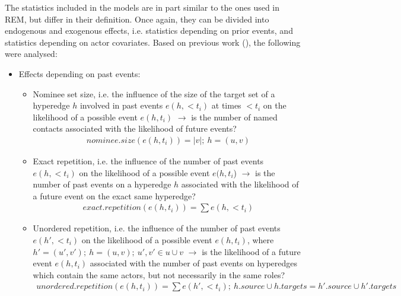 The statistics included in the models are in part similar to the ones used in REM, but differ in their definition. Once again, they can be divided into endogenous and exogenous effects, i.e. statistics depending on prior events, and statistics depending on actor covariates. Based on previous work (\cite{lerner2019rem,lerner2021relational,hancean2021role,hancean2022occupations}), the following were analysed:

\begin{itemize}
	\item Effects depending on past events:
	\begin{itemize}
		\item Nominee set size, i.e. the influence of the size of the target set of a hyperedge $h$ involved in past events $e(h,<t_i)$ at times $<t_i$ on the likelihood of a possible event $e(h,t_i)$ $\rightarrow$ is the number of named contacts associated with the likelihood of future events?
		\begin{align*}
			nominee.size(e(h,t_i)) = \lvert v \rvert; \: h = (u,v)
		\end{align*}
		\item Exact repetition, i.e. the influence of the number of past events $e(h,<t_i)$ on the likelihood of a possible event $e(h,t_i$) $\rightarrow$ is the number of past events on a hyperedge $h$ associated with the likelihood of a future event on the exact same hyperedge?
		\begin{align*}
			exact.repetition(e(h,t_i)) = \sum e(h,<t_i)
		\end{align*}
		\item Unordered repetition, i.e. the influence of the number of past events $e(h',<t_i)$ on the likelihood of a possible event $e(h,t_i)$, where $h' = (u',v'); \: h = (u,v); \: u',v' \in u \cup v$ $\rightarrow$ is the likelihood of a future event $e(h,t_i)$ associated with the number of past events on hyperedges which contain the same actors, but not necessarily in the same roles?
		\begin{align*}
			unordered.repetition(e(h,t_i)) = \sum e(h',<t_i); \: h.source \cup h.targets = h'.source \cup h'.targets
		\end{align*}
		\begin{figure}
			\begin{mdframed}
				\centering
				\begin{subfigure}[t]{0.45\linewidth}
					\vskip 0pt
\end{subfigure}
\end{mdframed}
\end{figure}
\end{itemize}
\end{itemize}
